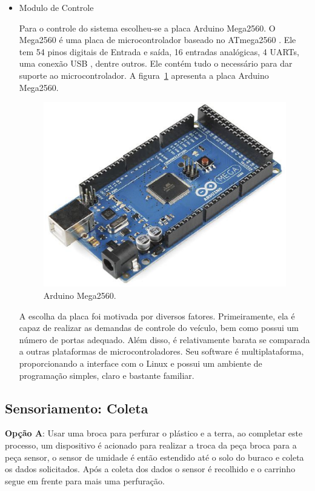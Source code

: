 \begin{itemize}
  \item Modulo de Controle

  Para o controle do sistema escolheu-se a placa Arduino Mega2560.
  O Mega2560 é uma placa de microcontrolador baseado no ATmega2560 .
  Ele tem 54 pinos digitais de Entrada e saída, 16 entradas analógicas,
  4 UARTs, uma conexão USB , dentre outros. Ele contém tudo o necessário
  para dar suporte ao microcontrolador. A figura~\ref{fig:arduino} apresenta a placa
  Arduino Mega2560.

\begin{figure}[!htbp]
\begin{center}
\includegraphics[width=.6\textwidth]{figuras/arduino.eps}
\caption{\label{fig:arduino}Arduino Mega2560.}
\end{center}
\end{figure}

\newpage

A escolha da placa foi motivada por diversos fatores.
Primeiramente, ela é capaz de realizar as demandas de controle do
veículo, bem como possui um número de portas adequado. Além disso,
é relativamente barata se comparada a outras plataformas de
microcontroladores. Seu software é multiplataforma, proporcionando
a interface com o Linux e possui um ambiente de programação simples,
claro e bastante familiar.


  \end{itemize}



  \subsection{Sensoriamento: Coleta}

  \textbf{Opção A}: Usar uma broca para perfurar o plástico e a terra, ao completar este
  processo, um dispositivo é acionado para realizar a troca da peça broca para
  a peça sensor, o sensor de umidade é então estendido até o solo do buraco e
  coleta os dados solicitados. Após a coleta dos dados o sensor é recolhido e o
  carrinho segue em frente para mais uma perfuração.

